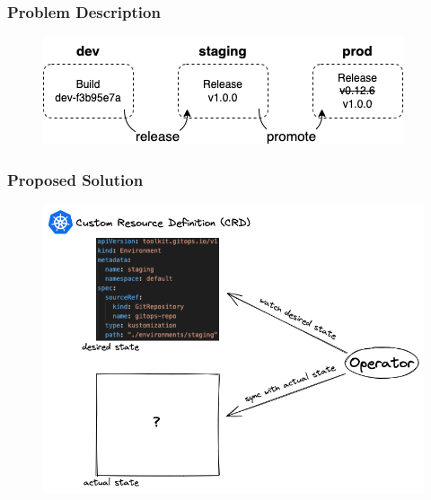 \documentclass{beamer}
\begin{document}
\begin{frame}
\frametitle{Problem Description}

\begin{figure}[h]
	\centering
	\includegraphics[width=.75\linewidth]{figures/release-promotion.drawio.png}
	\label{fig:releasePromotionProcess}	
\end{figure}



\end{frame}

\begin{frame}
\frametitle{Proposed Solution}

\begin{figure}[h]
	\centering
	\includegraphics[width=.90\linewidth]{assets/crd-desired-actual-state-operator.png}
	\label{fig:crdDesiredActualStateOperator}	
\end{figure}






\end{frame}
\end{document}
